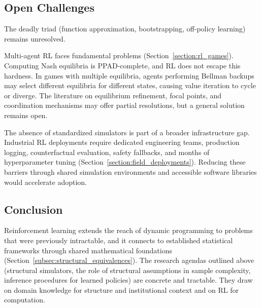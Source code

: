 \subsection{Open Challenges}

The deadly triad (function approximation, bootstrapping, off-policy learning) remains unresolved.

Multi-agent RL faces fundamental problems (Section~\ref{section:rl_games}). Computing Nash equilibria is PPAD-complete, and RL does not escape this hardness. In games with multiple equilibria, agents performing Bellman backups may select different equilibria for different states, causing value iteration to cycle or diverge. The literature on equilibrium refinement, focal points, and coordination mechanisms may offer partial resolutions, but a general solution remains open.

The absence of standardized simulators is part of a broader infrastructure gap. Industrial RL deployments require dedicated engineering teams, production logging, counterfactual evaluation, safety fallbacks, and months of hyperparameter tuning (Section~\ref{section:field_deployments}). Reducing these barriers through shared simulation environments and accessible software libraries would accelerate adoption.

\subsection{Conclusion}

Reinforcement learning extends the reach of dynamic programming to problems that were previously intractable, and it connects to established statistical frameworks through shared mathematical foundations (Section~\ref{subsec:structural_equivalences}). The research agendas outlined above (structural simulators, the role of structural assumptions in sample complexity, inference procedures for learned policies) are concrete and tractable. They draw on domain knowledge for structure and institutional context and on RL for computation.
